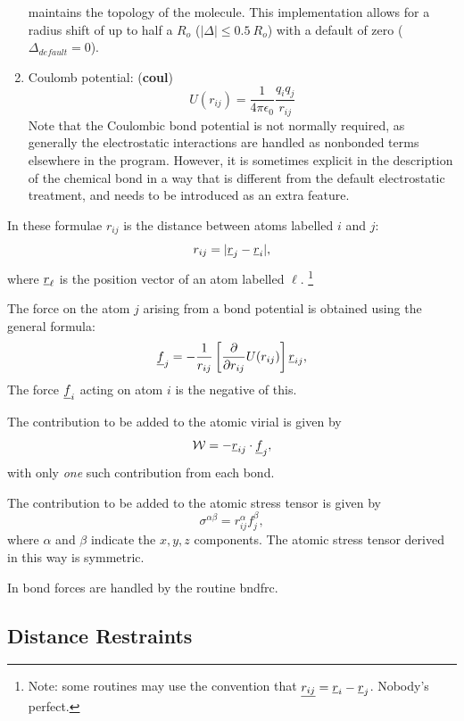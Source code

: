 \begin{enumerate}
maintains the topology of the molecule.  This implementation allows
for a radius shift of up to half a $R_{o}$ ($|\Delta| \le
0.5~R_{o}$) with a default of zero ($\Delta_{default} = 0$).
\item Coulomb potential: ({\bf coul})
\begin{equation}
U(r_{ij})=\frac{1}{4\pi\epsilon_{0}}\frac{q_{i}q_{j}}{r_{ij}}
\end{equation}
Note that the Coulombic bond potential is not normally required, as generally
the electrostatic interactions are handled as nonbonded terms elsewhere in the
program. However, it is sometimes explicit in the description of the chemical
bond in a way that is different from the default electrostatic treatment, and
needs to be introduced as an extra feature.
\end{enumerate}
In these formulae $r_{ij}$ is the distance between atoms labelled $i$
and
$j$:
\begin{equation}
r_{ij}=|\mbox{$\underline{r}$}_{j}-\mbox{$\underline{r}$}_{i}|,
\end{equation}
where $\mbox{$\underline{r}$}_{\ell}$ is the position vector of an atom labelled
$\ell$. \footnote{Note: some \D{} routines may use the convention that
$\mbox{$\underline{r_{ij}}$}=\mbox{$\underline{r}$}_{i}-\mbox{$\underline{r}$}_{j}$. Nobody's perfect.}

The force on the atom $j$ arising from a bond potential is obtained
using the general formula:
\begin{equation}
\mbox{$\underline{f}$}_{j}=-\frac{1}{{r}_{ij}}\left[
\frac{\partial }{\partial r_{ij}}U(r_{ij})\right]\mbox{$\underline{r}$}_{ij},
\end{equation}
The force $\mbox{$\underline{f}$}_{i}$ acting on atom $i$ is the negative of this.

The contribution to be added to the atomic virial is given by
\begin{equation}
{\cal W}=-\mbox{$\underline{r}$}_{ij}\cdot \mbox{$\underline{f}$}_{j},
\end{equation}
with only {\em one} such contribution from each bond.

The contribution to be added to the atomic stress tensor is
given by
\begin{equation}
\sigma^{\alpha \beta}=r_{ij}^{\alpha}f_{j}^{\beta},
\end{equation}
where $\alpha$ and $\beta$ indicate the $x,y,z$ components. The atomic
stress tensor derived in this way is symmetric.

In \D{} bond forces are handled by the routine {\sc bndfrc}.

\subsection{Distance Restraints}

